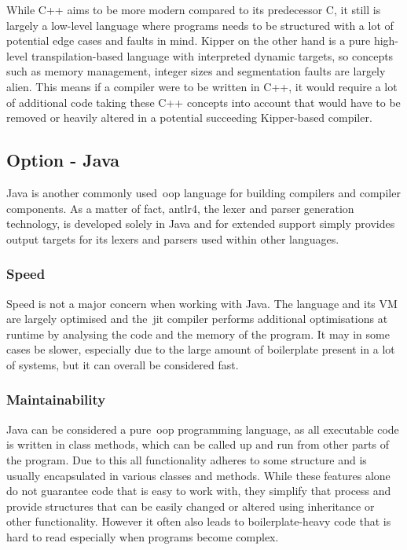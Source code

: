 While C++ aims to be more modern compared to its predecessor C, it still is largely a low-level language where programs needs to be structured with a lot of potential edge cases and faults in mind. Kipper on the other hand is a pure high-level \gls{transpilation}-based language with interpreted dynamic targets, so concepts such as memory management, integer sizes and segmentation faults are largely alien. This means if a compiler were to be written in C++, it would require a lot of additional code taking these C++ concepts into account that would have to be removed or heavily altered in a potential succeeding Kipper-based compiler.

\subsection{Option - Java}
\label{sec:programming-language-option-java}

Java is another commonly used~\acrshort{oop} language for building compilers and compiler components. As a matter of fact, \Gls{antlr4}, the lexer and parser generation technology, is developed solely in Java and for extended support simply provides output targets for its lexers and parsers used within other languages.

\subsubsection{Speed}

Speed is not a major concern when working with Java. The language and its VM are largely optimised and the~\acrshort{jit} compiler performs additional optimisations at runtime by analysing the code and the memory of the program. It may in some cases be slower, especially due to the large amount of boilerplate present in a lot of systems, but it can overall be considered fast.

\subsubsection{Maintainability}

Java can be considered a pure~\acrshort{oop} programming language, as all executable code is written in class methods, which can be called up and run from other parts of the program. Due to this all functionality adheres to some structure and is usually encapsulated in various classes and methods. While these features alone do not guarantee code that is easy to work with, they simplify that process and provide structures that can be easily changed or altered using inheritance or other functionality. However it often also leads to boilerplate-heavy code that is hard to read especially when programs become complex.

